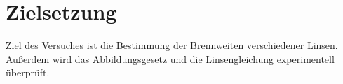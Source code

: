 \section{Zielsetzung}
\label{sec:Zielsetzung}
Ziel des Versuches ist die Bestimmung der Brennweiten verschiedener Linsen.
Außerdem wird das Abbildungsgesetz und die Linsengleichung experimentell überprüft.